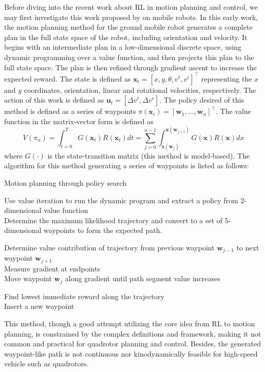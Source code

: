 \documentclass{article}
\newcommand{\B}[1]{\mathbf{#1}}
\begin{document}
Before diving into the recent work about RL in motion planning and 
control, we may first investigate this work proposed by 
\textcite{roy2002motion} on mobile robots.
In this early work, the motion planning method for the ground mobile robot 
generates a complete plan in the full state space of the robot, including orientation and velocity. 
It begins with an intermediate plan in a low-dimensional discrete space, using dynamic programming over a value function, and then projects this plan to the full state space. The plan is then refined through gradient ascent to increase the expected reward.
The state is defined as $\B{x}_t = \left[ x, y, \theta, v^t, v^r\right]^\top$ representing the $x$ and $y$ coordinates, orientation, linear 
and rotational velocities, respectively.
The action of this work is defined as $\B{u}_t = \left[ \Delta v^t, \Delta v^r \right]$.
The policy desired of this method is defined as a series 
of waypoints $\pi(\B{x}_i) = \left[ \B{w}_1, \dots, \B{w}_n\right]^\top$.
The value function in the matrix-vector form is defined as 
\[
  V(\pi_n) = \int_{t=0}^{T} G(\B{x}_t) R(\B{x}_t) dt 
           = \sum_{j=0}^{n-1} \int_{\B{x}(\B{w}_j)}^{\B{x}(\B{w}_{j+1})} G(\B{x}) R(\B{x}) dx 
\]
where $G(\cdot)$ is the state-transition matrix (this method
is model-based).
The algorithm for this method generating a series of waypoints is listed as follows:
\begin{algorithm}[h]
  \caption{Motion planning through policy search}
  \label{algo:roy2002}

  Use value iteration to run the dynamic program and extract a policy from 2-dimensional value function \\

  Determine the maximum likelihood trajectory and convert to a set of 5-dimensional waypoints to form the expected path. \\

  {
    \ForEach{Waypoint $\B{w}_j$}
    {
      Determine value contribution of trajectory from previous waypoint $\B{w}_{j-1}$ to next waypoint $\B{w}_{j+1}$ \\
      Measure gradient at endpoints \\
      Move waypoint $\B{w}_j$ along gradient until path segment value increases \\
    }

    Find lowest immediate reward along the trajectory \\
    Insert a new waypoint
  }
\end{algorithm}
This method, though a good attempt utilizing the core idea from RL to motion planning, 
is constrained by the complex definitions and framework, making
it not common and practical for quadrotor planning and control.
Besides, the generated waypoint-like path is not continuous nor 
kinodynamically feasible for high-speed vehicle such as quadrotors.
\end{document}
